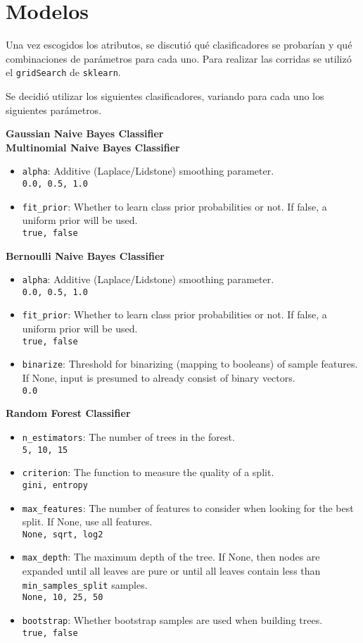 \section{Modelos}

Una vez escogidos los atributos, se discutió qué clasificadores se probarían y qué combinaciones de parámetros para cada uno. Para realizar las corridas se utilizó el \texttt{gridSearch} de \texttt{sklearn}.

Se decidió utilizar los siguientes clasificadores, variando para cada uno los siguientes parámetros.

\textbf{Gaussian Naive Bayes Classifier}\\
\textbf{Multinomial Naive Bayes Classifier}
\begin{itemize}
	\item \texttt{alpha}: Additive (Laplace/Lidstone) smoothing parameter.\\
	\texttt{0.0, 0.5, 1.0}
	\item \texttt{fit\_prior}: Whether to learn class prior probabilities or not. If false, a uniform prior will be used.\\
	\texttt{true, false}
\end{itemize}
\textbf{Bernoulli Naive Bayes Classifier}
\begin{itemize}
	\item \texttt{alpha}: Additive (Laplace/Lidstone) smoothing parameter.\\
	\texttt{0.0, 0.5, 1.0}
	\item \texttt{fit\_prior}: Whether to learn class prior probabilities or not. If false, a uniform prior will be used.\\
	\texttt{true, false}
	\item \texttt{binarize}: Threshold for binarizing (mapping to booleans) of sample features. If None, input is presumed to already consist of binary vectors.\\
	\texttt{0.0}
\end{itemize}
\textbf{Random Forest Classifier}
\begin{itemize}
	\item \texttt{n\_estimators}: The number of trees in the forest.\\
	\texttt{5, 10, 15}
	\item \texttt{criterion}: The function to measure the quality of a split.\\
	\texttt{gini, entropy}
	\item \texttt{max\_features}: The number of features to consider when looking for the best split. If None, use all features.\\
	\texttt{None, sqrt, log2}
	\item \texttt{max\_depth}: The maximum depth of the tree. If None, then nodes are expanded until all leaves are pure or until all leaves contain less than \texttt{min\_samples\_split} samples.\\
	\texttt{None, 10, 25, 50}
	\item \texttt{bootstrap}: Whether bootstrap samples are used when building trees.\\
	\texttt{true, false}
\end{itemize}
